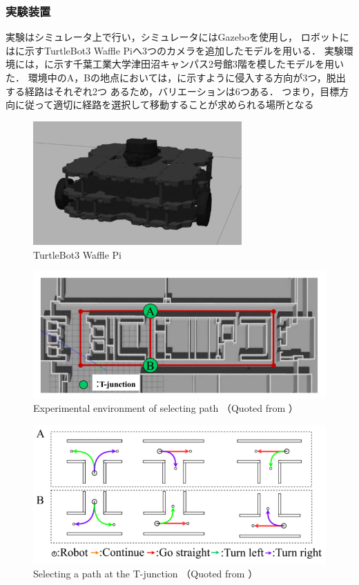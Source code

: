 \subsubsection{実験装置}
実験はシミュレータ上で行い，シミュレータにはGazebo\cite{Gazebo}を使用し，
ロボットにはに示すTurtleBot3 Waffle Pi\cite{ROBOTIS}へ3つのカメラを追加したモデルを用いる．
実験環境には，に示す千葉工業大学津田沼キャンパス2号館3階を模したモデルを用いた．
環境中のA，Bの地点においては，に示すように侵入する方向が3つ，脱出する経路はそれぞれ2つ
あるため，バリエーションは6つある．
つまり，目標方向に従って適切に経路を選択して移動することが求められる場所となる
\begin{figure}[htbp]
    \centering
     \includegraphics[width=80mm]{images/pdf/turtlebot3.pdf}
     \caption{TurtleBot3 Waffle Pi}
     \label{fig:turtlebot3}
\end{figure}
\begin{figure}[htbp]
    \centering
     \includegraphics[width=130mm]{images/pdf/haru_mech_exp.pdf}
     \caption{Experimental environment of selecting path （Quoted from \cite{haruyama2022}）}
     \label{fig:haru_mech_exp}
\end{figure}
\begin{figure}[htbp]
    \centering
     \includegraphics[width=130mm]{images/pdf/haru_mech_exp_ab.pdf}
     \caption{Selecting a path at the T-junction （Quoted from \cite{haruyama2022}）}
     \label{fig:haru_mech_exp_ab}
\end{figure}
\vspace{-1zh}
